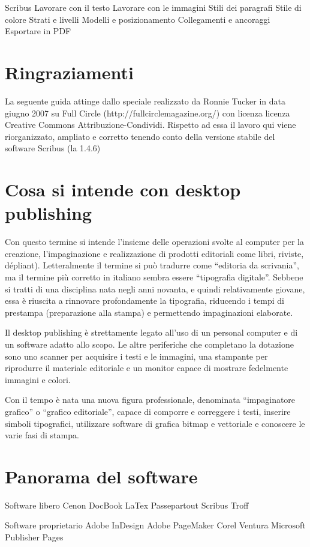 \documentclass[a4paper, 12pt]{book}
\begin{document}
Scribus
Lavorare con il testo
Lavorare con le immagini
Stili dei paragrafi
Stile di colore
Strati e livelli
Modelli e posizionamento
Collegamenti e ancoraggi
Esportare in PDF

\section{Ringraziamenti}
La seguente guida attinge dallo speciale realizzato da Ronnie Tucker in data giugno 2007 su Full Circle (http://fullcirclemagazine.org/) con licenza  licenza Creative Commons Attribuzione-Condividi. Rispetto ad essa il lavoro qui viene riorganizzato, ampliato  e corretto tenendo conto della versione stabile del software Scribus (la 1.4.6)

\section{Cosa si intende con desktop publishing}
Con questo termine si intende l'insieme delle operazioni svolte al computer per la creazione, l'impaginazione e realizzazione di prodotti editoriali come libri, riviste, dépliant). Letteralmente il termine si può tradurre come “editoria da scrivania”, ma il termine più corretto in italiano sembra essere “tipografia digitale”. Sebbene si tratti di una disciplina nata negli anni novanta, e quindi relativamente giovane, essa è riuscita a rinnovare profondamente la tipografia, riducendo i tempi di prestampa (preparazione alla stampa) e permettendo impaginazioni elaborate.

Il desktop publishing è strettamente legato all'uso di un personal computer e di un software adatto allo scopo. Le altre periferiche che completano la dotazione sono uno scanner per acquisire i testi e le immagini, una stampante per riprodurre il materiale editoriale e un monitor capace di mostrare fedelmente immagini e colori.

Con il tempo è nata una nuova figura professionale, denominata “impaginatore grafico” o “grafico editoriale”, capace di comporre e correggere i testi, inserire simboli tipografici, utilizzare software di grafica bitmap e vettoriale e conoscere le varie fasi di stampa.

\section{Panorama del software}
Software libero
Cenon
DocBook
LaTex
Passepartout
Scribus
Troff

Software proprietario
Adobe InDesign
Adobe PageMaker
Corel Ventura
Microsoft Publisher
Pages
\end{document}

